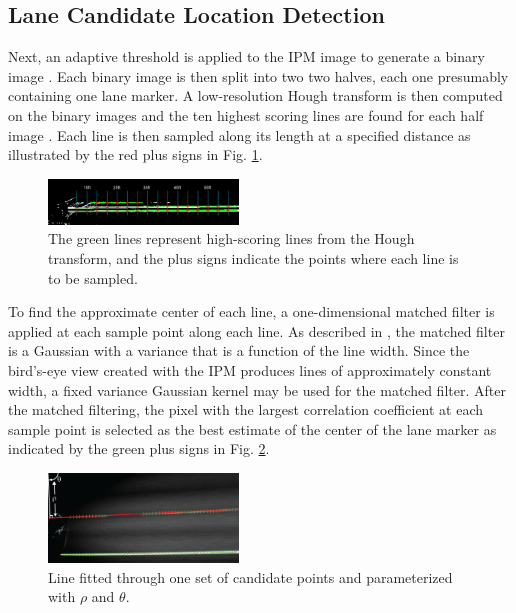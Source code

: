 \documentclass{article}
\begin{document}
\subsection{Lane Candidate Location Detection}
Next, an adaptive threshold is applied to the IPM image to generate a binary image \cite{borkar_layered_2009}. Each binary image is then split into two two halves, each one presumably containing one lane marker.
A low-resolution Hough transform is then computed on the binary images and the ten highest scoring lines are found for each half image \cite{borkar_layered_2009}. Each line is then sampled along its length at a specified distance as illustrated by the red plus signs in Fig. \ref{fig:sampling_points}.
\begin{figure}[htb]
  \centering
  \includegraphics[width=0.45\textwidth]{IMG/cand_lane_points.png}
  \caption{The green lines represent high-scoring lines from the Hough transform, and the plus signs indicate the points where each line is to be sampled.}
  \label{fig:sampling_points}
\end{figure}
To find the approximate center of each line, a one-dimensional matched filter is applied at each sample point along each line.
As described in \cite{borkar_layered_2009}, the matched filter is a Gaussian with a variance that is a function of the line width.
Since the bird's-eye view created with the IPM produces lines of approximately constant width, a fixed variance Gaussian kernel may be used for the matched filter.
After the matched filtering, the pixel with the largest correlation coefficient at each sample point is selected as the best estimate of the center of the lane marker as indicated by the green plus signs in Fig. \ref{fig:cand_pts}.
\begin{figure}[htb]
  \centering
  \includegraphics[width=0.45\textwidth]{IMG/rho_theta.png}
  \caption{Line fitted through one set of candidate points and parameterized with $\rho$ and $\theta$.}
  \label{fig:cand_pts}
\end{figure}
\end{document}
